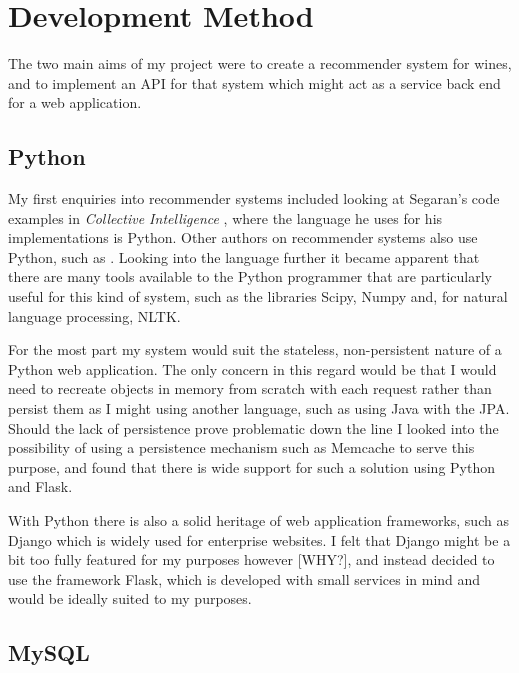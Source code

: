 \section{Development Method}\label{method}

The two main aims of my project were to create a recommender system for wines, and to implement an API for that system which might act as a service back end for a web application.

\subsection{Python}

My first enquiries into recommender systems included looking at Segaran's code examples in \textit{Collective Intelligence} \cite{Segaran07}, where the language he uses for his implementations is Python. Other authors on recommender systems also use Python, such as \cite{CitationNeeded}. Looking into the language further it became apparent that there are many tools available to the Python programmer that are particularly useful for this kind of system, such as the libraries Scipy\cite{Scipy}, Numpy\cite{Numpy} and, for natural language processing, NLTK\cite{NLTK}.

For the most part my system would suit the stateless, non-persistent nature of a Python web application. The only concern in this regard would be that I would need to recreate objects in memory from scratch with each request rather than persist them as I might using another language, such as using Java with the JPA\cite{JavaJPA}. Should the lack of persistence prove problematic down the line I looked into the possibility of using a persistence mechanism such as Memcache\cite{Memcache} to serve this purpose, and found that there is wide support for such a solution using Python and Flask\cite{MemcacheFlaskSupport}.

With Python there is also a solid heritage of web application frameworks, such as Django\cite{Django} which is widely used for enterprise websites. I felt that Django might be a bit too fully featured for my purposes however [WHY?], and instead decided to use the framework Flask\cite{Flask}, which is developed with small services in mind and would be ideally suited to my purposes.

\subsection{MySQL}

